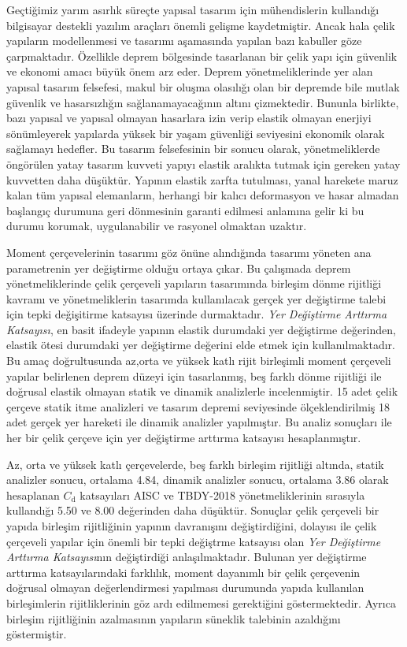 Geçtiğimiz yarım asırlık süreçte yapısal tasarım için mühendislerin
kullandığı bilgisayar destekli yazılım araçları önemli gelişme kaydetmiştir.
Ancak hala çelik yapıların modellenmesi ve tasarımı aşamasında yapılan
bazı kabuller göze çarpmaktadır. Özellikle deprem bölgesinde tasarlanan
bir çelik yapı için güvenlik ve ekonomi amacı büyük önem arz eder.
Deprem yönetmeliklerinde yer alan yapısal tasarım felsefesi, makul
bir oluşma olasılığı olan bir depremde bile mutlak güvenlik ve hasarsızlığın
sağlanamayacağının altını çizmektedir. Bununla birlikte, bazı yapısal
ve yapısal olmayan hasarlara izin verip elastik olmayan enerjiyi sönümleyerek
yapılarda yüksek bir yaşam güvenliği seviyesini ekonomik olarak sağlamayı
hedefler. Bu tasarım felsefesinin bir sonucu olarak, yönetmeliklerde
öngörülen yatay tasarım kuvveti yapıyı elastik aralıkta tutmak için
gereken yatay kuvvetten daha düşüktür. Yapının elastik zarfta tutulması,
yanal harekete maruz kalan tüm yapısal elemanların, herhangi bir kalıcı
deformasyon ve hasar almadan başlangıç durumuna geri dönmesinin garanti
edilmesi anlamına gelir ki bu durumu korumak, uygulanabilir ve rasyonel
olmaktan uzaktır.

Moment çerçevelerinin tasarımı göz önüne alındığında tasarımı yöneten
ana parametrenin yer değiştirme olduğu ortaya çıkar. Bu çalışmada
deprem yönetmeliklerinde çelik çerçeveli yapıların tasarımında birleşim
dönme rijitliği kavramı ve yönetmeliklerin tasarımda kullanılacak
gerçek yer değiştirme talebi için tepki değişitirme katsayısı üzerinde
durmaktadır. \emph{Yer Değiştirme Arttırma Katsayısı}, en basit ifadeyle
yapının elastik durumdaki yer değiştirme değerinden, elastik ötesi
durumdaki yer değiştirme değerini elde etmek için kullanılmaktadır.
Bu amaç doğrultusunda az,orta ve yüksek katlı rijit birleşimli moment
çerçeveli yapılar belirlenen deprem düzeyi için tasarlanmış, beş farklı
dönme rijitliği ile doğrusal elastik olmayan statik ve dinamik analizlerle
incelenmiştir. 15 adet çelik çerçeve statik itme analizleri ve tasarım
depremi seviyesinde ölçeklendirilmiş 18 adet gerçek yer hareketi ile
dinamik analizler yapılmıştır. Bu analiz sonuçları ile her bir çelik
çerçeve için yer değiştirme arttırma katsayısı hesaplanmıştır.

Az, orta ve yüksek katlı çerçevelerde, beş farklı birleşim rijitliği
altında, statik analizler sonucu, ortalama 4.84, dinamik analizler
sonucu, ortalama 3.86 olarak hesaplanan $C_{\mathrm{d}}$ katsayıları
AISC ve TBDY-2018 yönetmeliklerinin sırasıyla kullandığı 5.50 ve 8.00
değerinden daha düşüktür. Sonuçlar çelik çerçeveli bir yapıda birleşim
rijitliğinin yapının davranışını değiştirdiğini, dolayısı ile çelik
çerçeveli yapılar için önemli bir tepki değiştrme katsayısı olan \emph{Yer
Değiştirme Arttırma Katsayısı}nın değiştirdiği anlaşılmaktadır. Bulunan
yer değiştirme arttırma katsayılarındaki farklılık, moment dayanımlı
bir çelik çerçevenin doğrusal olmayan değerlendirmesi yapılması durumunda
yapıda kullanılan birleşimlerin rijitliklerinin göz ardı edilmemesi
gerektiğini göstermektedir. Ayrıca birleşim rijitliğinin azalmasının
yapıların süneklik talebinin azaldığını göstermiştir.
